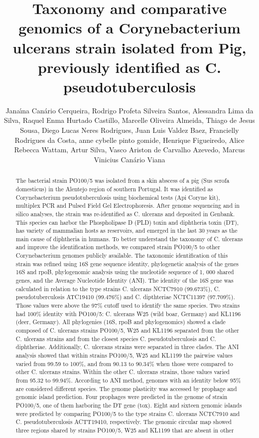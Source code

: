 \documentclass[twoside]{article}
\title{\vspace{-15mm}\fontsize{24pt}{10pt}\selectfont\textbf{ Taxonomy and comparative genomics of a Corynebacterium ulcerans strain isolated from Pig,  previously identified as C. pseudotuberculosis }} %
\author{ Jana\'{\i}na Can\'ario Cerqueira, Rodrigo Profeta Silveira Santos, Alessandra Lima da Silva, Raquel Enma Hurtado Castillo, Marcelle Oliveira Almeida, Thiago de Jesus Sousa, Diego Lucas Neres Rodrigues, Juan Luis Valdez Baez, Francielly Rodrigues da Costa, anne cybelle pinto gomide, Henrique Figueiredo, Alice Rebecca Wattam, Artur Silva, Vasco Ariston de Carvalho Azevedo, Marcus Vinicius Can\'ario Viana }
\affil{ University of Virginia }
\date{}
\begin{document}
  
  
  \maketitle %
  
  
  \thispagestyle{fancy} %
  
  
  \begin{abstract}
  The bacterial strain PO100/5 was isolated from a skin abscess of a pig (Sus scrofa domesticus) in the Alentejo region of southern Portugal. It was identified as Corynebacterium pseudotuberculosis using biochemical tests (Api Coryne\textsuperscript{\textcopyright} kit),  multiplex PCR and Pulsed Field Gel Electrophoresis. After genome sequencing and in silico analyses,  the strain was re-identified as C. ulcerans and deposited in Genbank. This species can harbor the Phospholipase D (PLD) toxin and diphtheria toxin (DT),  has variety of mammalian hosts as reservoirs,  and emerged in the last 30 years as the main cause of diphtheria in humans. To better understand the taxonomy of C. ulcerans and improve the identification methods,  we compared strain PO100/5 to other Corynebacterium genomes publicly available. The taxonomic identification of this strain was refined using 16S gene sequence identity,  phylogenetic analysis of the genes 16S and rpoB,  phylogenomic analysis using the nucleotide sequence of 1, 000 shared genes,  and the Average Nucleotide Identity (ANI). The identity of the 16S gene was calculated in relation to the type strains C. ulcerans NCTC7910 (99.673\%),  C. pseudotuberculosis ATC19410 (99.476\%) and C. dipthteriae NCTC11397 (97.709\%). Those values were above the 97\% cutoff used to identify the same species. Two strains had 100\% identity with PO100/5: C. ulcerans W25 (wild boar,  Germany) and KL1196 (deer,  Germany). All phylogenies (16S,  rpoB and phylogenomics) showed a clade composed of C. ulcerans strains PO100/5,  W25 and KL1196 separated from the other C. ulcerans strains and from the closest species C. pseudotuberculosis and C. diphtheriae. Additionally,  C. ulcerans strains were separated in three clades. The ANI analysis showed that within strains PO100/5,  W25 and KL1199 the pairwise values varied from 99.59 to 100\%,  and from 90.13 to 90.34\% when those were compared to other C. ulcerans strains. Within the other C. ulcerans strains,  those values varied from 95.32 to 99.94\%. According to ANI method,  genomes with an identity below 95\% are considered different species. The genome plasticity was accessed by prophage and genomic island prediction. Four prophages were predicted in the genome of strain PO100/5,  one of them harboring the DT gene (tox). Eight and sixteen genomic islands were predicted by comparing PO100/5 to the type strains C. ulcerans NCTC7910 and C. pseudotuberculosis ACTT19410,  respectively. The genomic circular map showed three regions shared by strains PO100/5,  W25 and KL1199 that are absent in other 
\end{abstract}
\end{document}
